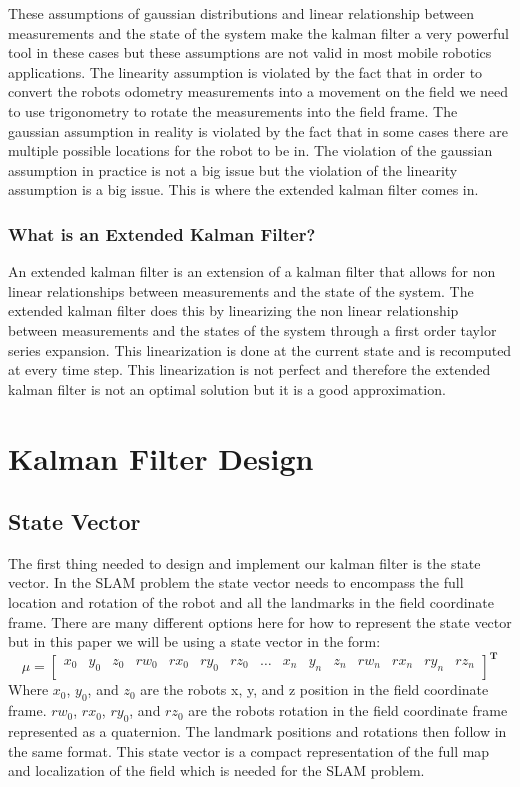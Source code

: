 \documentclass{scrartcl}
\begin{document}
These assumptions of gaussian distributions and linear relationship between measurements and the state of the system make the kalman filter a very powerful tool in these cases but these assumptions are not valid in most mobile robotics applications. The linearity assumption is violated by the fact that in order to convert the robots odometry measurements into a movement on the field we need to use trigonometry to rotate the measurements into the field frame. The gaussian assumption in reality is violated by the fact that in some cases there are multiple possible locations for the robot to be in. The violation of the gaussian assumption in practice is not a big issue but the violation of the linearity assumption is a big issue. This is where the extended kalman filter comes in.

\subsubsection{What is an Extended Kalman Filter?}
An extended kalman filter is an extension of a kalman filter that allows for non linear relationships between measurements and the state of the system. The extended kalman filter does this by linearizing the non linear relationship between measurements and the states of the system through a first order taylor series expansion. This linearization is done at the current state and is recomputed at every time step. This linearization is not perfect and therefore the extended kalman filter is not an optimal solution but it is a good approximation.

\newpage
\section{Kalman Filter Design}

\subsection{State Vector}
The first thing needed to design and implement our kalman filter is the state vector. In the SLAM problem the state vector needs to encompass the full location and rotation of the robot and all the landmarks in the field coordinate frame. There are many different options here for how to represent the state vector but in this paper we will be using a state vector in the form:
\setcounter{MaxMatrixCols}{20}
\begin{equation}
    \mu = \begin{bmatrix}
        x_{0} & y_{0} & z_{0} & rw_{0} & rx_{0} & ry_{0} & rz_{0} & \dots & x_{n} & y_{n} & z_{n} & rw_{n} & rx_{n} & ry_{n} & rz_{n} \\
    \end{bmatrix}^\mathbf{T}
\end{equation}
Where $x_{0}$, $y_{0}$, and $z_{0}$ are the robots x, y, and z position in the field coordinate frame. $rw_{0}$, $rx_{0}$, $ry_{0}$, and $rz_{0}$ are the robots rotation in the field coordinate frame represented as a quaternion. The landmark positions and rotations then follow in the same format. This state vector is a compact representation of the full map and localization of the field which is needed for the SLAM problem.
\end{document}
